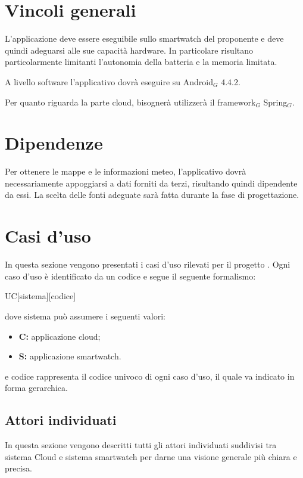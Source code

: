 \section{Vincoli generali}
L'applicazione deve essere eseguibile sullo smartwatch del proponente e deve quindi adeguarsi alle sue capacità hardware. In particolare risultano particolarmente limitanti l'autonomia della batteria e la memoria limitata.

A livello software l'applicativo dovrà eseguire su Android$_{G}$ 4.4.2.

Per quanto riguarda la parte cloud, bisognerà utilizzerà il framework$_{G}$ Spring$_{G}$.

\section{Dipendenze}
Per ottenere le mappe e le informazioni meteo, l'applicativo dovrà necessariamente appoggiarsi a dati forniti da terzi, risultando quindi dipendente da essi. La scelta delle fonti adeguate sarà fatta durante la fase di progettazione.

\section{Casi d'uso}
In questa sezione vengono presentati i casi d'uso rilevati per il progetto \CAPITOLATO{}. Ogni caso d'uso è identificato da un codice e segue il seguente formalismo: 
\begin{center}
UC[sistema][codice] 
\end{center} 
dove sistema può assumere i seguenti valori:
\begin{itemize}
\item \textbf{C:} applicazione cloud;
\item \textbf{S:} applicazione smartwatch.
\end{itemize}

e codice rappresenta il codice univoco di ogni caso d'uso, il quale va indicato in forma gerarchica.

\subsection{Attori individuati}
In questa sezione vengono descritti tutti gli attori individuati suddivisi tra sistema Cloud e sistema smartwatch per darne una visione generale più chiara e precisa.

